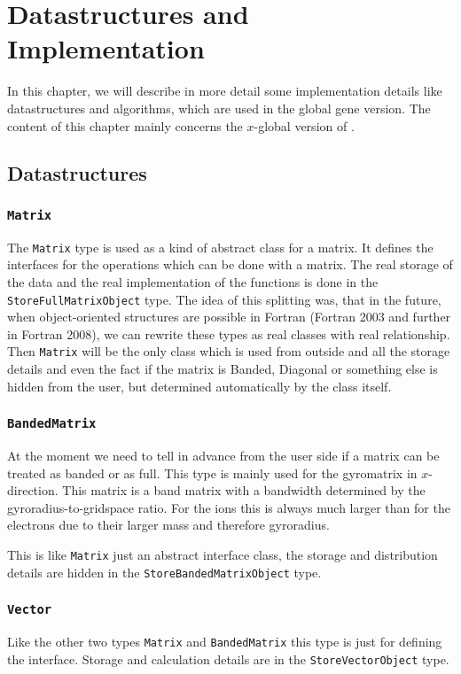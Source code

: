 
\chapter{Datastructures and Implementation}
\label{sec:implementation}
In this chapter, we will describe in more detail some implementation
details like datastructures and algorithms, which are used in the
global gene version. The content of this chapter mainly concerns the
$x$-global version of \gene.

\section{Datastructures}
\label{sec:datastructures}

\subsection{\texttt{Matrix}}
\label{sec:matrix}
The \texttt{Matrix} type is used as a kind of abstract class for a
matrix. It defines the interfaces for the operations which can be done
with a matrix. The real storage of the data and the real
implementation of the functions is done in the
\texttt{StoreFullMatrixObject} type. The idea of this splitting was,
that in the future, when object-oriented structures are possible in
Fortran (Fortran 2003 and further in Fortran 2008), we can rewrite
these types as real classes with real relationship. Then
\texttt{Matrix} will be the only class which is used from outside and
all the storage details and even the fact if the matrix is Banded,
Diagonal or something else is hidden from the user, but determined
automatically by the class itself.


\subsection{\texttt{BandedMatrix}}
At the moment we need to tell in advance from the user side if a
matrix can be treated as banded or as full. This type is mainly used
for the gyromatrix in $x$-direction. This matrix is a band matrix with
a bandwidth determined by the gyroradius-to-gridspace ratio. For the
ions this is always much larger than for the electrons due to their
larger mass and therefore gyroradius.

This is like \texttt{Matrix} just an abstract interface class, the
storage and distribution details are hidden in the
\texttt{StoreBandedMatrixObject} type.

\subsection{\texttt{Vector}}
Like the other two types \texttt{Matrix} and \texttt{BandedMatrix}
this type is just for defining the interface. Storage and calculation
details are in the \texttt{StoreVectorObject} type.

